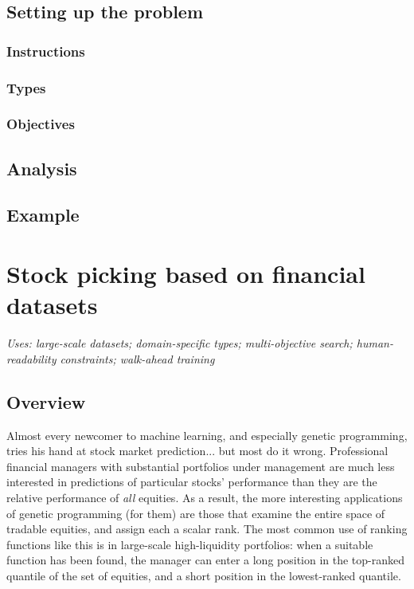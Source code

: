 \documentclass[12pt]{article}
\begin{document}
\subsection{Setting up the problem}

\subsubsection{Instructions}

\subsubsection{Types}

\subsubsection{Objectives}

\subsection{Analysis}

\subsection{Example}

\section{Stock picking based on financial datasets}

\textit{Uses: large-scale datasets; domain-specific types; multi-objective search; human-readability constraints; walk-ahead training}

\subsection{Overview}

Almost every newcomer to machine learning, and especially genetic programming, tries his hand at stock market prediction... but most do it wrong. Professional financial managers with substantial portfolios under management are much less interested in predictions of particular stocks' performance than they are the relative performance of \emph{all} equities. As a result, the more interesting applications of genetic programming (for them) are those that examine the entire space of tradable equities, and assign each a scalar rank. The most common use of ranking functions like this is in large-scale high-liquidity portfolios: when a suitable function has been found, the manager can enter a long position in the top-ranked quantile of the set of equities, and a short position in the lowest-ranked quantile.
\end{document}
